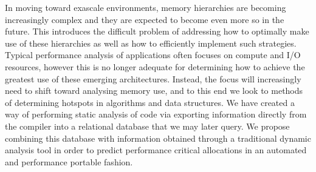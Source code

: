 In moving toward exascale environments, memory hierarchies are becoming increasingly complex and they are expected to become even more so in the future.
This introduces the difficult problem of addressing how to optimally make use of these hierarchies as well as how to efficiently implement such strategies.
Typical performance analysis of applications often focuses on compute and I/O resources, however this is no longer adequate for determining how to achieve the greatest use of these emerging architectures.
Instead, the focus will increasingly need to shift toward analysing memory use, and to this end we look to methods of determining hotspots in algorithms and data structures.
We have created a way of performing static analysis of code via exporting information directly from the compiler into a relational database that we may later query.
We propose combining this database with information obtained through a traditional dynamic analysis tool in order to predict performance critical allocations in an automated and performance portable fashion.
